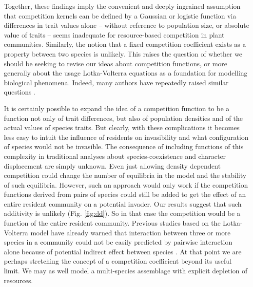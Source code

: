 \documentclass[a4paper,11pt]{article}
\begin{document}
Together, these findings imply the convenient and deeply ingrained assumption that
competition kernels can be defined by  a Gaussian or logistic function
via differences in trait values
alone -- without reference to population size, or absolute value of
traits -- seems inadequate for resource-based competition in plant
communities.
%
Similarly, the notion that a fixed competition coefficient exists as a
property between two species is unlikely. This raises the question of
whether we should be seeking to revise our ideas about competition
functions, or more generally about the usage Lotka-Volterra equations as
a foundation for modelling biological phenomena.  Indeed, many authors
have repeatedly raised similar questions \citep[e.g.][]{Andrewartha-1953,
  Neill-1974, Abrams-1975, Wangersky-1978,Abrams-1980, Tilman-1987,
  Abrams-2008}.

It is certainly possible to expand the idea of a competition function to
be a function not only of trait differences, but also of population
densities and of the actual values of species traits. But clearly, with these complications it becomes less easy to intuit the influence of residents on invasibility and what configuration of species would not be invasible. The consequence of including functions of
this complexity in traditional analyses about species-coexistence and
character displacement are simply unknown.  Even just allowing density
dependent competition could change the number of equilibria in the
model and the stability of such equilibria.
%
However, such an approach would only work if the competition functions
derived from pairs of species could still be added to get the effect
of an entire resident community on a potential invader.
%
Our results suggest that such additivity is unlikely
(Fig. \ref{fig:dd}). %
 So in that case the competition would be a
function of the entire resident community. Previous studies based on the Lotka-Volterra model have already warned that interaction between three or more species in a community could not be easily predicted by pairwise interaction alone because of potential indirect effect between species \citep{Levine-1976}.
 At that point we are
perhaps stretching the concept of a competition coefficient
beyond its useful limit. We may as well
model a multi-species assemblage with explicit depletion of resources.
\end{document}
